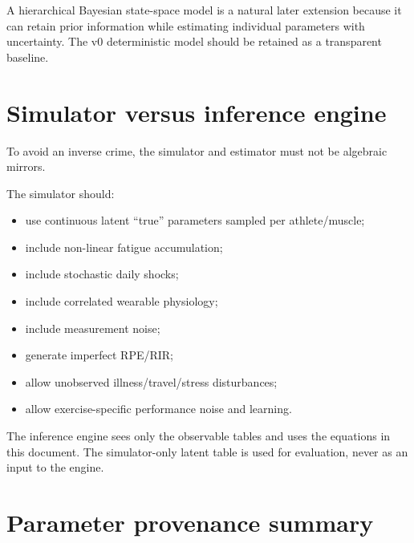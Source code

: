 \documentclass[11pt]{article}
\begin{document}
A hierarchical Bayesian state-space model is a natural later extension because it can retain prior information while estimating individual parameters with uncertainty. The v0 deterministic model should be retained as a transparent baseline.

\section{Simulator versus inference engine}

To avoid an inverse crime, the simulator and estimator must not be algebraic mirrors.

The simulator should:

\begin{itemize}
    \item use continuous latent ``true'' parameters sampled per athlete/muscle;
    \item include non-linear fatigue accumulation;
    \item include stochastic daily shocks;
    \item include correlated wearable physiology;
    \item include measurement noise;
    \item generate imperfect RPE/RIR;
    \item allow unobserved illness/travel/stress disturbances;
    \item allow exercise-specific performance noise and learning.
\end{itemize}

The inference engine sees only the observable tables and uses the equations in this document. The simulator-only latent table is used for evaluation, never as an input to the engine.

\section{Parameter provenance summary}
\end{document}
